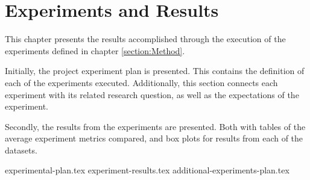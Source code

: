 \chapter{Experiments and Results}
\label{section:Results}

This chapter presents the results accomplished through the execution of the experiments defined in chapter \cref{section:Method}.

Initially, the project experiment plan is presented.
This contains the definition of each of the experiments executed.
Additionally, this section connects each experiment with its related research question,
as well as the expectations of the experiment.

Secondly, the results from the experiments are presented.
Both with tables of the average experiment metrics compared, and box plots for results from each of the datasets.


{experimental-plan.tex}
{experiment-results.tex}
{additional-experiments-plan.tex}




\iffalse

  \section{Experimental Setup}
  \label{sec:experimentalSetup}

  The experimental setup should include all data - parameters etc, that would allow a person to repeat your experiments.

  \section{Experimental Results}
  \label{sec:experimentalResults}

  Results should be clearly displayed and should provide a suitable representation of your results for the points you wish to make. Graphs should be labeled in a legible font and if more than one result is displayed on the same graph then these should be clearly marked.   Please choose carefully rather than presenting every results. Too much information is hard to read and often hides the key information you wish to present. Make use of statistical methods when presenting results, where possible to strengthen the results.  Further, the format of the presentation of results should be chosen based on what issues in the results you wish to highlight. You may wish to present a subset in the experimental section and provide additional results in the appendix.
\fi